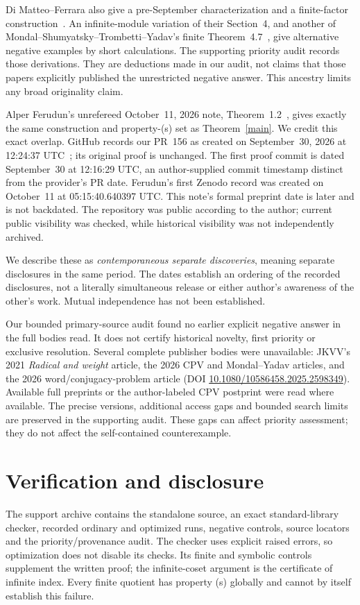 \documentclass[11pt]{article}
\begin{document}
Di Matteo--Ferrara also give a pre-September characterization and
a finite-factor construction~\cite{DMF}.
An infinite-module variation of their Section~4, and another of
Mondal--Shumyatsky--Trombetti--Yadav's finite Theorem~4.7~\cite{MSTY},
give alternative negative examples by short calculations.
The supporting priority audit records those derivations.
They are deductions made in our audit, not claims that those papers
explicitly published the unrestricted negative answer.
This ancestry limits any broad originality claim.

Alper Ferudun's unrefereed October~11, 2026 note,
Theorem~1.2~\cite{Ferudun}, gives exactly the same construction and
property-(s) set as Theorem~\ref{main}. We credit this exact overlap.
GitHub records our PR~156 as created on September~30, 2026 at
12:24:37 UTC~\cite{Repository}; its original proof is unchanged.
The first proof commit is dated September~30 at 12:16:29 UTC, an
author-supplied commit timestamp distinct from the provider's PR date.
Ferudun's first Zenodo record was created on October~11 at
05:15:40.640397 UTC. This note's formal preprint date is later and is
not backdated. The repository was public according to the author;
current public visibility was checked, while historical visibility
was not independently archived.

We describe these as \emph{contemporaneous separate discoveries},
meaning separate disclosures in the same period. The dates establish
an ordering of the recorded disclosures, not a literally simultaneous
release or either author's awareness of the other's work.
Mutual independence has not been established.

Our bounded primary-source audit found no earlier explicit negative
answer in the full bodies read. It does not certify historical novelty,
first priority or exclusive resolution.
Several complete publisher bodies were unavailable: JKVV's 2021
\emph{Radical and weight} article, the 2026 CPV and Mondal--Yadav
articles, and the 2026 word/conjugacy-problem article
(DOI \href{https://doi.org/10.1080/10586458.2025.2598349}
{10.1080/10586458.2025.2598349}).
Available full preprints or the author-labeled CPV postprint were
read where available. The precise versions, additional access gaps
and bounded search limits are preserved in the supporting audit.
These gaps can affect priority assessment; they do not affect the
self-contained counterexample.

\section*{Verification and disclosure}
The support archive contains the standalone source, an exact
standard-library checker, recorded ordinary and optimized runs,
negative controls, source locators and the priority/provenance audit.
The checker uses explicit raised errors, so optimization does not
disable its checks. Its finite and symbolic controls supplement the
written proof; the infinite-coset argument is the certificate of
infinite index. Every finite quotient has property (s) globally and
cannot by itself establish this failure.
\end{document}
